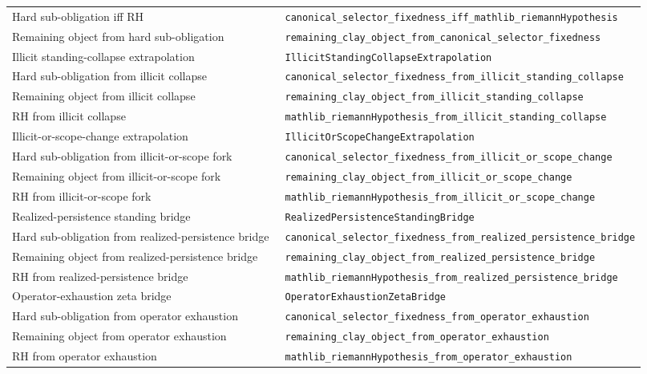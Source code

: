 \documentclass[11pt]{article}
\begin{document}
\begin{center}
\begin{longtable}{p{0.44\linewidth}p{0.48\linewidth}}
Hard sub-obligation iff RH
  & \texttt{canonical\_selector\_fixedness\_iff\_mathlib\_riemannHypothesis} \\
Remaining object from hard sub-obligation
  & \texttt{remaining\_clay\_object\_from\_canonical\_selector\_fixedness} \\
Illicit standing-collapse extrapolation
  & \texttt{IllicitStandingCollapseExtrapolation} \\
Hard sub-obligation from illicit collapse
  & \texttt{canonical\_selector\_fixedness\_from\_illicit\_standing\_collapse} \\
Remaining object from illicit collapse
  & \texttt{remaining\_clay\_object\_from\_illicit\_standing\_collapse} \\
RH from illicit collapse
  & \texttt{mathlib\_riemannHypothesis\_from\_illicit\_standing\_collapse} \\
Illicit-or-scope-change extrapolation
  & \texttt{IllicitOrScopeChangeExtrapolation} \\
Hard sub-obligation from illicit-or-scope fork
  & \texttt{canonical\_selector\_fixedness\_from\_illicit\_or\_scope\_change} \\
Remaining object from illicit-or-scope fork
  & \texttt{remaining\_clay\_object\_from\_illicit\_or\_scope\_change} \\
RH from illicit-or-scope fork
  & \texttt{mathlib\_riemannHypothesis\_from\_illicit\_or\_scope\_change} \\
Realized-persistence standing bridge
  & \texttt{RealizedPersistenceStandingBridge} \\
Hard sub-obligation from realized-persistence bridge
  & \texttt{canonical\_selector\_fixedness\_from\_realized\_persistence\_bridge} \\
Remaining object from realized-persistence bridge
  & \texttt{remaining\_clay\_object\_from\_realized\_persistence\_bridge} \\
RH from realized-persistence bridge
  & \texttt{mathlib\_riemannHypothesis\_from\_realized\_persistence\_bridge} \\
Operator-exhaustion zeta bridge
  & \texttt{OperatorExhaustionZetaBridge} \\
Hard sub-obligation from operator exhaustion
  & \texttt{canonical\_selector\_fixedness\_from\_operator\_exhaustion} \\
Remaining object from operator exhaustion
  & \texttt{remaining\_clay\_object\_from\_operator\_exhaustion} \\
RH from operator exhaustion
  & \texttt{mathlib\_riemannHypothesis\_from\_operator\_exhaustion} \\

\end{longtable}
\end{center}
\end{document}
